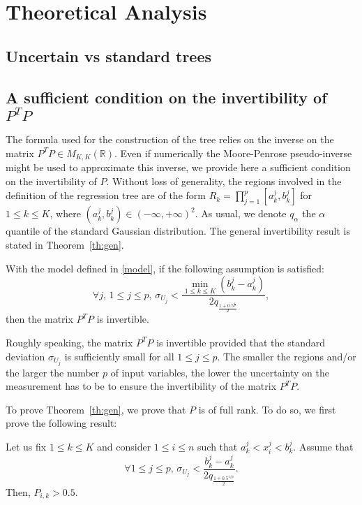 \section{Theoretical Analysis}
\label{sec:th}

\subsection{Uncertain vs standard trees}




\subsection{A sufficient condition on the invertibility of $P^T P$}
 
The formula used for the construction of the tree relies on the inverse on the matrix $P^T P\in M_{K,K}(\mathbb{R})$. Even if numerically the Moore-Penrose pseudo-inverse might be used to approximate this inverse, we provide here a sufficient condition on the invertibility of $P$. Without loss of generality, the regions involved in the definition of the regression tree are of the form $R_k =\prod_{j=1}^p [a_k^j,b_k^j]$ for $1\leq k \leq K$, where $(a_k^j, b_k^j) \in (-\infty, +\infty)^2$. As usual, we denote $q_\alpha$ the $\alpha$ quantile of the standard Gaussian distribution. The general invertibility result is stated in Theorem~\ref{th:gen}.
%
\begin{theorem}\label{th:gen}
With the model defined in \eqref{model}, if the following assumption is satisfied:
     \[
     \forall j, \, 1\leq j \leq p, \,
     \sigma_{U_j} < \frac{\min\limits_{1\leq k\leq K}(b_k^j-a_k^j)}{2 q_{\frac{1+0.5^{\frac{1}{p}}}{2}}},
     \]
then the matrix $P^TP$ is invertible.
\end{theorem}
%
Roughly speaking, the matrix $P^T P$ is invertible provided that the standard deviation $\sigma_{U_j}$ is sufficiently small for all $1\leq j \leq p$. The smaller the regions and/or the larger the number $p$ of input variables, the lower the uncertainty on the measurement has to be to ensure the invertibility of the matrix $P^T P$.

To prove Theorem~\ref{th:gen}, we prove that $P$ is of full rank. To do so, we first prove the following result:

\begin{proposition}
\label{prop}
Let us fix $1\leq k \leq K$ and consider $1\leq i \leq n$ such that $a_k^j<x_i^j<b_k^j$. Assume that 
\begin{equation}\label{assSigma}
    \forall 1\leq j \leq p,\, \sigma_{U_j}<\frac{b_k^j-a_k^j}{2q_{\frac{1+0.5^{1/p}}{2}}}.
\end{equation}
Then, $P_{i,k}>0.5$.
\end{proposition}

